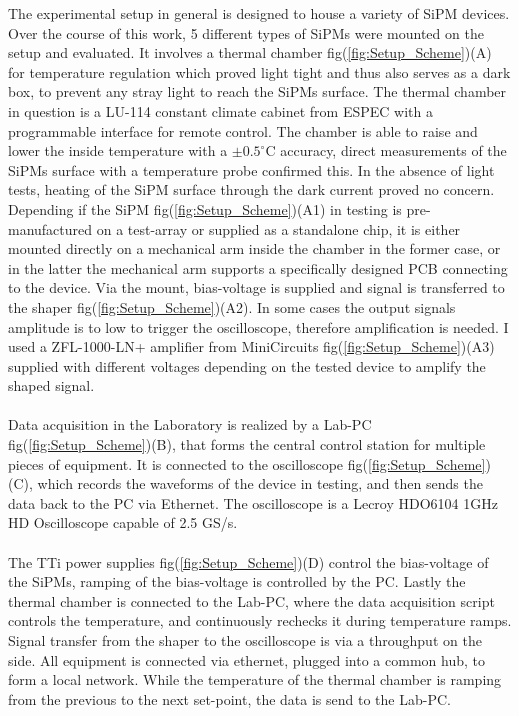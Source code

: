 \documentclass[12pt,article,type=msc,colorback,accentcolor=tud9c]{tudthesis}
\begin{document}
The experimental setup in general is designed to house a variety of SiPM devices. Over the course of this work, 5 different types of SiPMs were mounted on the setup and evaluated. It involves a thermal chamber fig(\ref{fig:Setup_Scheme})(A) for temperature regulation which proved light tight and thus also serves as a dark box, to prevent any stray light to reach the SiPMs surface. The thermal chamber in question is a LU-114 constant climate cabinet from ESPEC with a programmable interface for remote control. The chamber is able to raise and lower the inside temperature with a $\pm0.5^\circ$C accuracy, direct measurements of the SiPMs surface with a temperature probe confirmed this. In the absence of light tests, heating of the SiPM surface through the dark current proved no concern.\\ Depending if the SiPM fig(\ref{fig:Setup_Scheme})(A1) in testing is pre-manufactured on a test-array or supplied as a standalone chip, it is either mounted directly on a mechanical arm inside the chamber in the former case, or in the latter the mechanical arm supports a specifically designed PCB connecting to the device. Via the mount, bias-voltage is supplied and signal is transferred to the shaper fig(\ref{fig:Setup_Scheme})(A2). In some cases the output signals amplitude is to low to trigger the oscilloscope, therefore amplification is needed. I used a ZFL-1000-LN+ amplifier from MiniCircuits fig(\ref{fig:Setup_Scheme})(A3) supplied with different voltages depending on the tested device to amplify the shaped signal.\\\\
Data acquisition in the Laboratory is realized by a Lab-PC fig(\ref{fig:Setup_Scheme})(B), that forms the central control station for multiple pieces of equipment. It is connected to the oscilloscope fig(\ref{fig:Setup_Scheme})(C), which records the waveforms of the device in testing, and then sends the data back to the PC via Ethernet. The oscilloscope is a Lecroy HDO6104 1GHz HD Oscilloscope capable of 2.5 GS/s.\\\\ The TTi power supplies fig(\ref{fig:Setup_Scheme})(D) control the bias-voltage of the SiPMs, ramping of the bias-voltage is controlled by the PC. Lastly the thermal chamber is connected to the Lab-PC, where the data acquisition script controls the temperature, and continuously rechecks it during temperature ramps. Signal transfer from the shaper to the oscilloscope is via a throughput on the side. All equipment is connected via ethernet, plugged into a common hub, to form a local network. While the temperature of the thermal chamber is ramping from the previous to the next set-point, the data is send to the Lab-PC.\\\\
\end{document}

